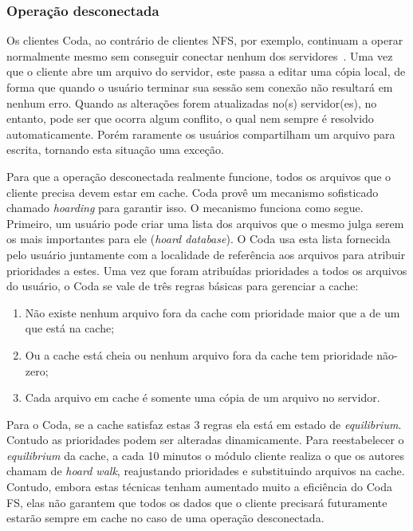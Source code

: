 \subsubsection*{Operação desconectada}

Os clientes Coda, ao contrário de clientes NFS, por exemplo, continuam a operar normalmente mesmo sem conseguir conectar nenhum dos servidores~\cite{kistler1992disconnected}. Uma vez que o cliente abre um arquivo do servidor, este  passa a editar uma cópia local, de forma que quando o usuário terminar sua sessão sem conexão não resultará em nenhum erro. Quando as alterações forem atualizadas no(s) servidor(es), no entanto, pode ser que ocorra algum conflito, o qual nem sempre é resolvido automaticamente. Porém raramente os usuários compartilham um arquivo para escrita, tornando esta situação uma exceção.

Para que a operação desconectada realmente funcione, todos os arquivos que o cliente precisa devem estar em cache. Coda provê um mecanismo sofisticado chamado \emph{hoarding} para garantir isso. O mecanismo funciona como segue. Primeiro, um usuário pode criar uma lista dos arquivos que o mesmo julga serem os mais importantes para ele (\emph{hoard database}). O Coda usa esta lista fornecida pelo usuário juntamente com a localidade de referência aos arquivos para atribuir prioridades a estes. Uma vez que foram atribuídas prioridades a todos os arquivos do usuário, o Coda se vale de três regras básicas para gerenciar a cache:

\begin{enumerate}
	\item Não existe nenhum arquivo fora da cache com prioridade maior que a de um que está na cache;
	\item Ou a cache está cheia ou nenhum arquivo fora da cache tem prioridade não-zero;
	\item Cada arquivo em cache é somente uma cópia de um arquivo no servidor.
\end{enumerate}

Para o Coda, se a cache satisfaz estas 3 regras ela está em estado de \emph{equilibrium}. Contudo as prioridades podem ser alteradas dinamicamente. Para reestabelecer o \emph{equilibrium} da cache, a cada 10 minutos o módulo cliente realiza o que os autores chamam de \emph{hoard walk}, reajustando prioridades e substituindo arquivos na cache. Contudo, embora estas técnicas tenham aumentado muito a eficiência do Coda FS, elas não garantem que todos os dados que o cliente precisará futuramente estarão sempre em cache no caso de uma operação desconectada.

